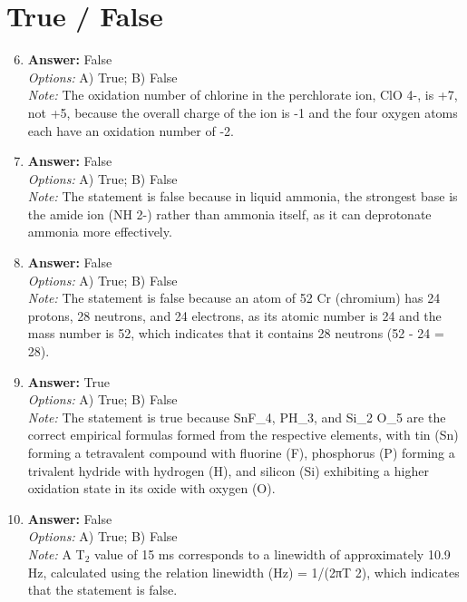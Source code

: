 \documentclass[12pt]{article}
\begin{document}
\section*{True / False}
\begin{enumerate}[label=\arabic*.]
\setcounter{enumi}{5}
\item \textbf{Answer:} False
\\ \textit{Options:} A) True; B) False
\\ \textit{Note:} The oxidation number of chlorine in the perchlorate ion, ClO 4-, is +7, not +5, because the overall charge of the ion is -1 and the four oxygen atoms each have an oxidation number of -2.
\item \textbf{Answer:} False
\\ \textit{Options:} A) True; B) False
\\ \textit{Note:} The statement is false because in liquid ammonia, the strongest base is the amide ion (NH 2-) rather than ammonia itself, as it can deprotonate ammonia more effectively.
\item \textbf{Answer:} False
\\ \textit{Options:} A) True; B) False
\\ \textit{Note:} The statement is false because an atom of 52 Cr (chromium) has 24 protons, 28 neutrons, and 24 electrons, as its atomic number is 24 and the mass number is 52, which indicates that it contains 28 neutrons (52 - 24 = 28).
\item \textbf{Answer:} True
\\ \textit{Options:} A) True; B) False
\\ \textit{Note:} The statement is true because SnF\_4, PH\_3, and Si\_2 O\_5 are the correct empirical formulas formed from the respective elements, with tin (Sn) forming a tetravalent compound with fluorine (F), phosphorus (P) forming a trivalent hydride with hydrogen (H), and silicon (Si) exhibiting a higher oxidation state in its oxide with oxygen (O).
\item \textbf{Answer:} False
\\ \textit{Options:} A) True; B) False
\\ \textit{Note:} A T$_{2}$ value of 15 ms corresponds to a linewidth of approximately 10.9 Hz, calculated using the relation linewidth (Hz) = 1/(2πT 2), which indicates that the statement is false.
\end{enumerate}
\end{document}

